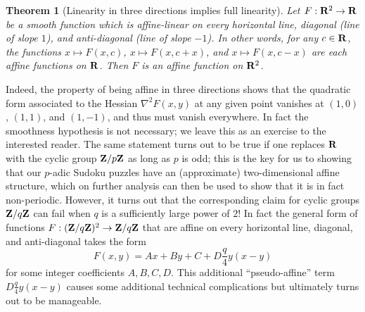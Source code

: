 \documentclass[11pt]{article}
\newtheorem{theorem}{Theorem}
\theoremstyle{definition}
\theoremstyle{remark}
\begin{document}
\begin{theorem}[Linearity in three directions implies full linearity]
  Let \({F: {\bf R}^2 \rightarrow {\bf R}}\) be a smooth function which is affine-linear on every horizontal line, diagonal (line of slope \({1}\)), and anti-diagonal (line of slope \({-1}\)). In other words, for any \({c \in {\bf R}}\), the functions \({x \mapsto F(x,c)}\), \({x \mapsto F(x,c+x)}\), and \({x \mapsto F(x,c-x)}\) are each affine functions on \({{\bf R}}\). Then \({F}\) is an affine function on \({{\bf R}^2}\). 
\end{theorem}


Indeed, the property of being affine in three directions shows that the quadratic form associated to the Hessian \({\nabla^2 F(x,y)}\) at any given point vanishes at \({(1,0)}\), \({(1,1)}\), and \({(1,-1)}\), and thus must vanish everywhere. In fact the smoothness hypothesis is not necessary; we leave this as an exercise to the interested reader. The same statement turns out to be true if one replaces \({{\bf R}}\) with the cyclic group \({{\bf Z}/p{\bf Z}}\) as long as \({p}\) is odd; this is the key for us to showing that our \({p}\)-adic Sudoku puzzles have an (approximate) two-dimensional affine structure, which on further analysis can then be used to show that it is in fact non-periodic. However, it turns out that the corresponding claim for cyclic groups \({{\bf Z}/q{\bf Z}}\) can fail when \({q}\) is a sufficiently large power of \({2}\)! In fact the general form of functions \({F: ({\bf Z}/q{\bf Z})^2 \rightarrow {\bf Z}/q{\bf Z}}\) that are affine on every horizontal line, diagonal, and anti-diagonal takes the form \[\displaystyle  F(x,y) = Ax + By + C + D \frac{q}{4} y(x-y) \]
 for some integer coefficients \({A,B,C,D}\). This additional “pseudo-affine” term \({D \frac{q}{4} y(x-y)}\) causes some additional technical complications but ultimately turns out to be manageable.
\end{document}
